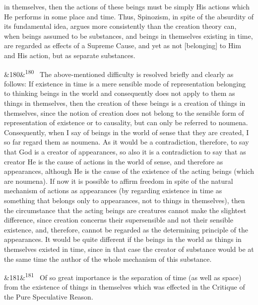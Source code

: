 \documentclass[12pt]{article}
\newcommand{\para}[1][]{\par\noindent\ifx&#1&\else\textsuperscript{\footnotesize #1}~\fi}
\begin{document}
in themselves, then the actions of these beings must be simply His actions which He performs in some place and time. Thus, Spinozism, in spite of the absurdity of its fundamental idea, argues more consistently than the creation theory can, when beings assumed to be substances, and beings in themselves existing in time, are regarded as effects of a Supreme Cause, and yet as not [belonging] to Him and His action, but as separate substances.

\para[180] The above-mentioned difficulty is resolved briefly and clearly as follows: If existence in time is a mere sensible mode of representation belonging to thinking beings in the world and consequently does not apply to them as things in themselves, then the creation of these beings is a creation of things in themselves, since the notion of creation does not belong to the sensible form of representation of existence or to causality, but can only be referred to noumena. Consequently, when I say of beings in the world of sense that they are created, I so far regard them as noumena. As it would be a contradiction, therefore, to say that God is a creator of appearances, so also it is a contradiction to say that as creator He is the cause of actions in the world of sense, and therefore as appearances, although He is the cause of the existence of the acting beings (which are noumena). If now it is possible to affirm freedom in spite of the natural mechanism of actions as appearances (by regarding existence in time as something that belongs only to appearances, not to things in themselves), then the circumstance that the acting beings are creatures cannot make the slightest difference, since creation concerns their supersensible and not their sensible existence, and, therefore, cannot be regarded as the determining principle of the appearances. It would be quite different if the beings in the world as things in themselves existed in time, since in that case the creator of substance would be at the same time the author of the whole mechanism of this substance.

\para[181] Of so great importance is the separation of time (as well as space) from the existence of things in themselves which was effected in the Critique of the Pure Speculative Reason.
\end{document}
